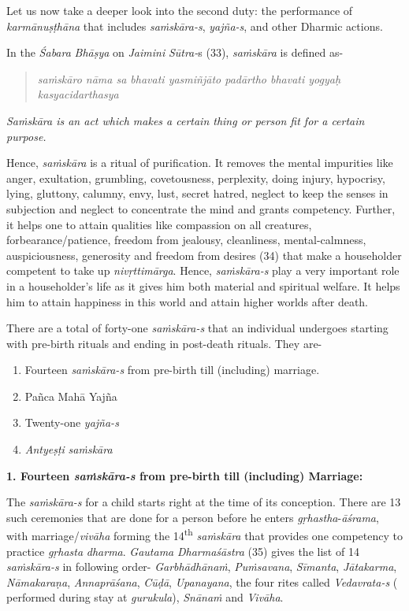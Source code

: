 Let us now take a deeper look into the second duty: the performance of \emph{karmānuṣṭhāna} that includes \emph{saṁskāra-s}, \emph{yajña-s}, and other Dharmic actions.

In the \emph{Śabara} \emph{Bhāṣya} on \emph{Jaimini} \emph{Sūtra-}s (33), \emph{saṁskāra} is defined as-

\begin{verse}
\emph{saṁskāro nāma sa bhavati yasmiñjāto padārtho bhavati yogyaḥ kasyacidarthasya }
\end{verse}

\emph{Saṁskāra is an act which makes a certain thing or person fit for a certain purpose.}

Hence, \emph{saṁskāra} is a ritual of purification. It removes the mental impurities like anger, exultation, grumbling, covetousness, perplexity, doing injury, hypocrisy, lying, gluttony, calumny, envy, lust, secret hatred, neglect to keep the senses in subjection and neglect to concentrate the mind and grants competency. Further, it helps one to attain qualities like compassion on all creatures, forbearance/patience, freedom from jealousy, cleanliness, mental-calmness, auspiciousness, generosity and freedom from desires (34) that make a householder competent to take up \emph{nivṛttimārga}. Hence, \emph{saṁskāra-s} play a very important role in a householder's life as it gives him both material and spiritual welfare. It helps him to attain happiness in this world and attain higher worlds after death.

There are a total of forty-one \emph{saṁskāra-s} that an individual undergoes starting with pre-birth rituals and ending in post-death rituals. They are-

\begin{enumerate}
\itemsep=0pt
\item
  Fourteen \emph{saṁskāra-s} from pre-birth till (including) marriage.
\item
  Pañca Mahā Yajña
\item
  Twenty-one \emph{yajña-s}
\item
  \emph{Antyeṣṭi} \emph{saṁskāra}
\end{enumerate}

\textbf{1. Fourteen \emph{saṁskāra-s} from pre-birth till (including) Marriage:}

The \emph{saṁskāra-s} for a child starts right at the time of its conception. There are 13 such ceremonies that are done for a person before he enters \emph{gṛhastha}-\emph{āśrama}, with marriage/\emph{vivāha} forming the 14\textsuperscript{th} \emph{saṁskāra} that provides one competency to practice \emph{gṛhasta} \emph{dharma}. \emph{Gautama} \emph{Dharmaśāstra} (35) gives the list of 14 \emph{saṁskāra-s} in following order- \emph{Garbhādhānaṁ}, \emph{Puṁsavana}, \emph{Sīmanta}, \emph{Jātakarma}, \emph{Nāmakaraṇa}, \emph{Annaprāśana}, \emph{Cūḍā}, \emph{Upanayana}, the four rites called \emph{Vedavrata-s} ( performed during stay at \emph{gurukula}), \emph{Snānaṁ} and \emph{Vivāha}.


